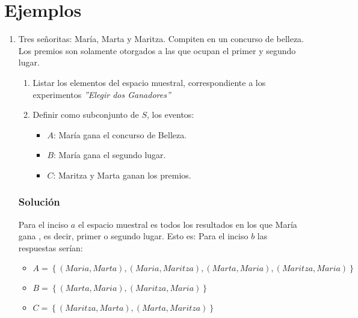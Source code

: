 \section{Ejemplos}
\begin{enumerate}
\item Tres señoritas: María, Marta y Maritza. Compiten en un concurso de belleza. Los premios son solamente otorgados a las que ocupan el primer y segundo lugar.
\begin{enumerate}
\item Listar los elementos del espacio muestral, correspondiente a los experimentos \textit{''Elegir dos Ganadores''}
\item Definir como subconjunto de $S$, los eventos:
\begin{itemize}
\item $A$: María gana el concurso de Belleza.
\item $B$: María gana el segundo lugar.
\item $C$: Maritza y Marta ganan los premios.
\end{itemize}
\end{enumerate}
\subsubsection{Solución}
Para el inciso $a$ el espacio muestral es todos los resultados en los que María gana , es decir, primer o segundo lugar. Esto es:
Para el inciso $b$ las respuestas serían:
\begin{itemize}
\item $A=\left\lbrace (Maria,Marta),(Maria,Maritza),(Marta,Maria),(Maritza,Maria)\right\rbrace $
\item $B=\left\lbrace (Marta,Maria),(Maritza,Maria)\right\rbrace$
\item $C=\left\lbrace (Maritza,Marta),(Marta,Maritza)\right\rbrace$
\end{itemize}

\end{enumerate}